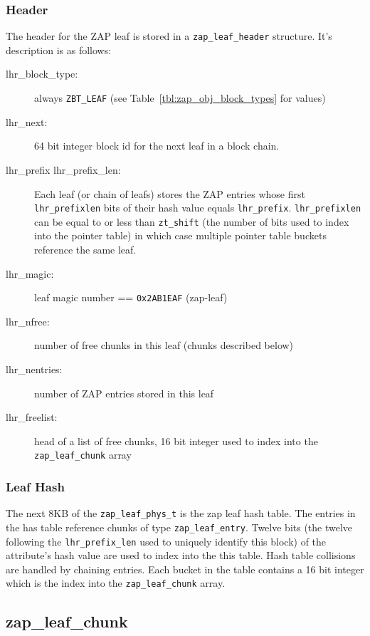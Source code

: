 \subsubsection{Header}
The header for the ZAP leaf is stored in a \lstinline{zap_leaf_header} structure.
It's description is as follows:
\begin{description}

\item[lhr\_block\_type:]
  always \lstinline{ZBT_LEAF}
  (see Table~\ref{tbl:zap_obj_block_types} for values)
\item[lhr\_next:]
  64 bit integer block id for the next leaf in a block chain.
\item[lhr\_prefix  lhr\_prefix\_len:]
  Each leaf (or chain of leafs) stores the ZAP entries
  whose first \lstinline{lhr_prefixlen} bits of their hash value equals \lstinline{lhr_prefix}.
  \lstinline{lhr_prefixlen} can be equal to or less than \lstinline{zt_shift}
  (the number of bits used to index into the pointer table)
  in which case multiple pointer table buckets reference the same leaf.
\item[lhr\_magic:]
  leaf magic number == \lstinline{0x2AB1EAF} (zap-leaf)
\item[lhr\_nfree:]
  number of free chunks in this leaf (chunks described below)
\item[lhr\_nentries:]
  number of ZAP entries stored in this leaf
\item[lhr\_freelist:]
  head of a list of free chunks,
  16 bit integer used to index into the \lstinline{zap_leaf_chunk} array

\end{description}

\subsubsection{Leaf Hash}
The next 8KB of the \lstinline{zap_leaf_phys_t} is the zap leaf hash table.
The entries in the has table reference chunks of type \lstinline{zap_leaf_entry}.
Twelve bits (the twelve following the \lstinline{lhr_prefix_len}
used to uniquely identify this block)
of the attribute's hash value are used to index into the this table.
Hash table collisions are handled by chaining entries.
Each bucket in the table contains a 16 bit integer
which is the index into the \lstinline{zap_leaf_chunk} array.

\subsection{zap\_leaf\_chunk}

